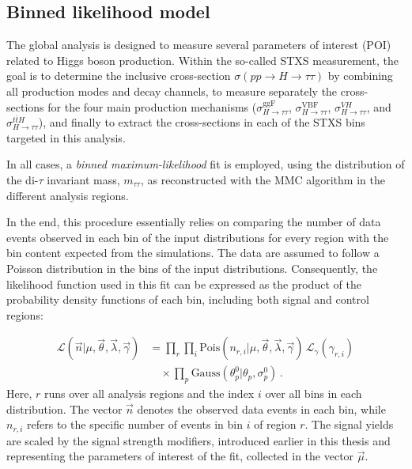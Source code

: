 \subsection{Binned likelihood model}
\label{likelihood_fit}

The global \htautau analysis is designed to measure several parameters of interest (POI) related to Higgs boson production. 
Within the so-called STXS measurement, the goal is to determine the inclusive cross-section $\sigma(pp \to H \to \tau\tau)$ by combining all production modes and decay channels, 
to measure separately the cross-sections for the four main production mechanisms ($\sigma^{\mathrm{ggF}}_{H\to\tau\tau}$, $\sigma^{\mathrm{VBF}}_{H\to\tau\tau}$, $\sigma^{VH}_{H\to\tau\tau}$, and $\sigma^{t\bar{t}H}_{H\to\tau\tau}$), 
and finally to extract the cross-sections in each of the STXS bins targeted in this analysis.

In all cases, a \textit{binned maximum-likelihood} fit is employed, using the distribution of the di-$\tau$ invariant mass, $m_{\tau\tau}$, 
as reconstructed with the MMC algorithm in the different analysis regions.

In the end, this procedure essentially relies on comparing the number of data events observed in each bin of the input distributions for every region with the bin content expected from the simulations. The data are assumed to follow a Poisson distribution in the bins of the input distributions. Consequently, the likelihood function used in this fit can be expressed as the product of the probability density functions of each bin, including both signal and control regions:

\begin{equation}
  \begin{aligned}
  \mathcal{L}(\vec{n}|\mu, \vec{\theta}, \vec{\lambda}, \vec{\gamma}) 
    &= \prod_{r } \prod_{i } 
       \text{Pois}(n_{r,i}|\mu, \vec{\theta}, \vec{\lambda}, \vec{\gamma}) \,
       \mathcal{L}_{\gamma}(\gamma_{r,i}) \\[0.4em]
    &\quad \times \prod_{p} \text{Gauss}(\theta^{0}_{p}|\theta_{p}, \sigma^{0}_{p}) \, .
  \end{aligned}
  \end{equation}
  Here, $r$ runs over all analysis regions and the index $i$ over all bins in each distribution. 
  The vector $\vec{n}$ denotes the observed data events in each bin, while $n_{r,i}$ refers to the specific number of events in bin $i$ of region $r$. 
  The signal yields are scaled by the signal strength modifiers, introduced earlier in this thesis and representing the parameters of interest of the fit, collected in the vector $\vec{\mu}$. 
  
